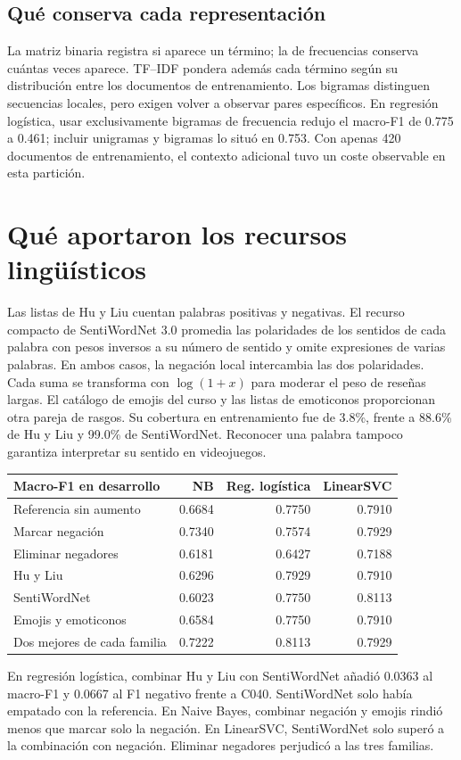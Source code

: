 \documentclass[11pt,letterpaper]{article}
\begin{document}
\subsection*{Qué conserva cada representación}
La matriz binaria registra si aparece un término; la de frecuencias conserva cuántas veces aparece. TF--IDF pondera además cada término según su distribución entre los documentos de entrenamiento. Los bigramas distinguen secuencias locales, pero exigen volver a observar pares específicos. En regresión logística, usar exclusivamente bigramas de frecuencia redujo el macro-F1 de 0.775 a 0.461; incluir unigramas y bigramas lo situó en 0.753. Con apenas 420 documentos de entrenamiento, el contexto adicional tuvo un coste observable en esta partición.

\newpage
\section{Qué aportaron los recursos lingüísticos}
Las listas de Hu y Liu cuentan palabras positivas y negativas. El recurso compacto de SentiWordNet 3.0 promedia las polaridades de los sentidos de cada palabra con pesos inversos a su número de sentido y omite expresiones de varias palabras. En ambos casos, la negación local intercambia las dos polaridades. Cada suma se transforma con $\log(1+x)$ para moderar el peso de reseñas largas. El catálogo de emojis del curso y las listas de emoticonos proporcionan otra pareja de rasgos. Su cobertura en entrenamiento fue de 3.8\%, frente a 88.6\% de Hu y Liu y 99.0\% de SentiWordNet. Reconocer una palabra tampoco garantiza interpretar su sentido en videojuegos.
\begin{center}\small\begin{tabular}{lrrr}\toprule
Macro-F1 en desarrollo & NB & Reg. logística & LinearSVC\\\midrule
Referencia sin aumento & 0.6684 & 0.7750 & 0.7910\\
Marcar negación & 0.7340 & 0.7574 & 0.7929\\
Eliminar negadores & 0.6181 & 0.6427 & 0.7188\\
Hu y Liu & 0.6296 & 0.7929 & 0.7910\\
SentiWordNet & 0.6023 & 0.7750 & 0.8113\\
Emojis y emoticonos & 0.6584 & 0.7750 & 0.7910\\
Dos mejores de cada familia & 0.7222 & 0.8113 & 0.7929\\\bottomrule\end{tabular}\end{center}
En regresión logística, combinar Hu y Liu con SentiWordNet añadió 0.0363 al macro-F1 y 0.0667 al F1 negativo frente a C040. SentiWordNet solo había empatado con la referencia. En Naive Bayes, combinar negación y emojis rindió menos que marcar solo la negación. En LinearSVC, SentiWordNet solo superó a la combinación con negación. Eliminar negadores perjudicó a las tres familias.
\end{document}
